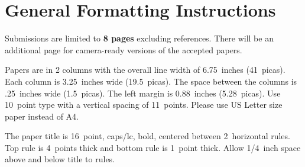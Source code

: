 \documentclass[twoside]{article}
\begin{document}
%

%


\begin{abstract}
  The Abstract paragraph should be indented 0.25 inch (1.5 picas) on
  both left and right-hand margins. Use 10~point type, with a vertical
  spacing of 11~points. The \textbf{Abstract} heading must be centered,
  bold, and in point size 12. Two line spaces precede the
  Abstract. The Abstract must be limited to one paragraph.
\end{abstract}

\section{General Formatting Instructions}

Submissions are limited to \textbf{8 pages} excluding references.
There will be an additional page for camera-ready versions of the accepted papers.

Papers are in 2 columns with the overall line width of 6.75~inches (41~picas).
Each column is 3.25~inches wide (19.5~picas).  The space
between the columns is .25~inches wide (1.5~picas).  The left margin is 0.88~inches (5.28~picas).
Use 10~point type with a vertical spacing of
11~points. Please use US Letter size paper instead of A4.

The paper title is 16~point, caps/lc, bold, centered between 2~horizontal rules.
Top rule is 4~points thick and bottom rule is 1~point thick.
Allow 1/4~inch space above and below title to rules.
\end{document}
